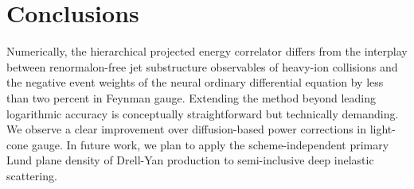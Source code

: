 \section{Conclusions}\label{sec:conclusions}

Numerically, the hierarchical projected energy correlator differs from
the interplay between renormalon-free jet substructure observables of
heavy-ion collisions and the negative event weights of the neural
ordinary differential equation by less than two percent in Feynman
gauge. Extending the method beyond leading logarithmic accuracy is
conceptually straightforward but technically demanding. We observe a
clear improvement over diffusion-based power corrections in light-cone
gauge. In future work, we plan to apply the scheme-independent primary
Lund plane density of Drell-Yan production to semi-inclusive deep
inelastic scattering.


